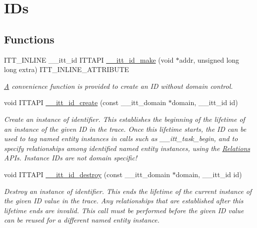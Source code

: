 \hypertarget{group__ids}{}\section{I\+Ds}
\label{group__ids}
\subsection*{Functions}
\begin{DoxyCompactItemize}
\item 
I\+T\+T\+\_\+\+I\+N\+L\+I\+N\+E \+\_\+\+\_\+itt\+\_\+id I\+T\+T\+A\+P\+I \hyperlink{group__ids_ga3a34add1c1ff5133f68e87a6f21ce8cb}{\+\_\+\+\_\+itt\+\_\+id\+\_\+make} (void $\ast$addr, unsigned long long extra) I\+T\+T\+\_\+\+I\+N\+L\+I\+N\+E\+\_\+\+A\+T\+T\+R\+I\+B\+U\+T\+E
\begin{DoxyCompactList}\small\item\em \hyperlink{structA}{A} convenience function is provided to create an I\+D without domain control. \end{DoxyCompactList}\item 
void I\+T\+T\+A\+P\+I \hyperlink{group__ids_ga935dd3611e942563fb60db1ccee453c7}{\+\_\+\+\_\+itt\+\_\+id\+\_\+create} (const \+\_\+\+\_\+itt\+\_\+domain $\ast$domain, \+\_\+\+\_\+itt\+\_\+id id)
\begin{DoxyCompactList}\small\item\em Create an instance of identifier. This establishes the beginning of the lifetime of an instance of the given I\+D in the trace. Once this lifetime starts, the I\+D can be used to tag named entity instances in calls such as \+\_\+\+\_\+itt\+\_\+task\+\_\+begin, and to specify relationships among identified named entity instances, using the \hyperlink{group__relations}{Relations} A\+P\+Is. Instance I\+Ds are not domain specific! \end{DoxyCompactList}\item 
void I\+T\+T\+A\+P\+I \hyperlink{group__ids_ga9b1b0ac6c1084ae77b22708886f468a5}{\+\_\+\+\_\+itt\+\_\+id\+\_\+destroy} (const \+\_\+\+\_\+itt\+\_\+domain $\ast$domain, \+\_\+\+\_\+itt\+\_\+id id)
\begin{DoxyCompactList}\small\item\em Destroy an instance of identifier. This ends the lifetime of the current instance of the given I\+D value in the trace. Any relationships that are established after this lifetime ends are invalid. This call must be performed before the given I\+D value can be reused for a different named entity instance. \end{DoxyCompactList}\end{DoxyCompactItemize}


